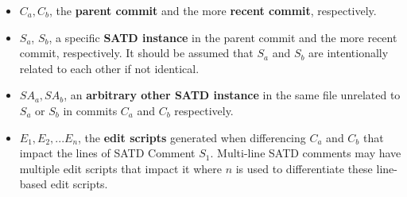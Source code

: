 \documentclass[3p]{elsarticle}
\begin{document}
\begin{itemize}
    \item $C_a, C_b$, the \textbf{parent commit} and the more \textbf{recent commit}, respectively.
    \item $S_a$, $S_b$, a specific \textbf{SATD instance} in the parent commit and the more recent commit, respectively. It should be assumed that $S_a$ and $S_b$ are intentionally related to each other if not identical.
    \item $SA_a, SA_b$, an \textbf{arbitrary other SATD instance} in the same file unrelated to $S_a$ or $S_b$ in commits $C_a$ and $C_b$ respectively.
    \item $E_{1}, E_{2}, ... E_{n}$, the \textbf{edit scripts} generated when differencing $C_a$ and $C_b$ that impact the lines of SATD Comment $S_1$. Multi-line SATD comments may have multiple edit scripts that impact it where $n$ is used to differentiate these line-based edit scripts.
\end{itemize}
\end{document}
